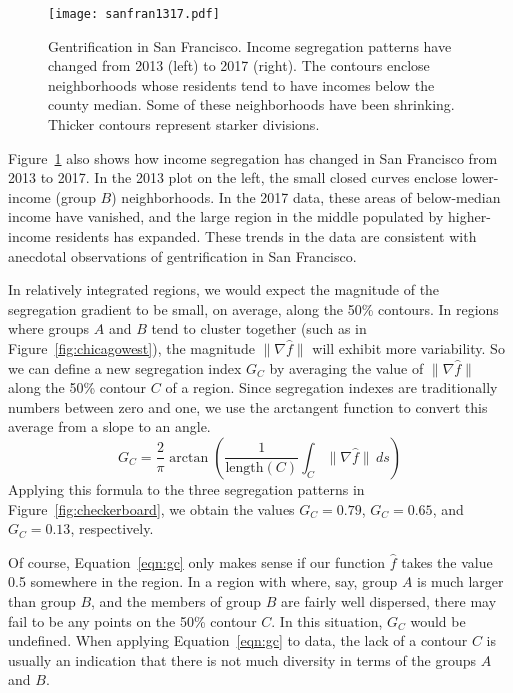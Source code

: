 \documentclass{article}
\theoremstyle{theorem}
\theoremstyle{definition}
\begin{document}
\begin{figure}
  \texttt{[image: sanfran1317.pdf]} %
  \caption{Gentrification in San Francisco. Income segregation patterns have changed from 2013 (left) to 2017 (right). The contours enclose neighborhoods whose residents tend to have incomes below the county median. Some of these neighborhoods have been shrinking. Thicker contours represent starker divisions.}
  \label{fig:sanfran1317}
\end{figure}

Figure~\ref{fig:sanfran1317} also shows how income segregation has changed in San Francisco from 2013 to 2017. In the 2013 plot on the left, the small closed curves enclose lower-income (group $B$) neighborhoods. In the 2017 data, these areas of below-median income have vanished, and the large region in the middle populated by higher-income residents has expanded. These trends in the data are consistent with anecdotal observations of gentrification in San Francisco. \cite{pogash15}

In relatively integrated regions, we would expect the magnitude of the segregation gradient to be small, on average, along the 50\% contours. In regions where groups $A$ and $B$ tend to cluster together (such as in Figure~\ref{fig:chicagowest}), the magnitude $\lVert \nabla \hat{f} \rVert$ will exhibit more variability. So we can define a new segregation index $G_C$ by averaging the value of  $\lVert \nabla \hat{f} \rVert$ along the 50\% contour $C$ of a region. Since segregation indexes are traditionally numbers between zero and one, we use the arctangent function to convert this average from a slope to an angle.
\begin{equation}\label{eqn:gc}
   G_C = \frac{2}{\pi} \arctan \left(\frac{1}{\mathrm{length}(C)} \int_C \lVert \nabla \hat{f} \rVert \, ds \right)
\end{equation}
Applying this formula to the three segregation patterns in Figure~\ref{fig:checkerboard}, we obtain the values $G_C=0.79$, $G_C=0.65$, and $G_C=0.13$, respectively.

Of course, Equation~\ref{eqn:gc} only makes sense if our function $\hat{f}$ takes the value 0.5 somewhere in the region. In a region with where, say, group $A$ is much larger than group $B$, and the members of group $B$ are fairly well dispersed, there may fail to be any points on the 50\% contour $C$. In this situation, $G_C$ would be undefined. When applying Equation~\ref{eqn:gc} to data, the lack of a contour $C$ is usually an indication that there is not much diversity in terms of the groups $A$ and $B$.
\end{document}
